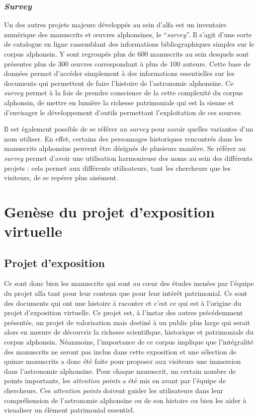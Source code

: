 	\subsubsection{\textit{Survey}}
    Un des autres projets majeurs développés au sein d’\acrshort{alfa} est un inventaire numérique des manuscrits et œuvres alphonsines, le “\textit{survey}”. Il s’agit d’une sorte de catalogue en ligne rassemblant des informations bibliographiques simples sur le corpus alphonsin. Y sont regroupés plus de 600 manuscrits au sein desquels sont présentes plus de 300 œuvres correspondant à plus de 100 auteurs. Cette base de données permet d’accéder simplement à des informations essentielles sur les documents qui permettent de faire l’histoire de l’astronomie alphonsine. Ce \textit{survey} permet à la fois de prendre conscience de la cette complexité du corpus alphonsin, de mettre en lumière la richesse patrimoniale qui est la sienne et d’envisager le développement d’outils permettant l’exploitation de ces sources.
    
    Il est également possible de se référer au \textit{survey} pour savoir quelles variantes d’un nom utiliser. En effet, certains des personnages historiques rencontrés dans les manuscrits alphonsins peuvent être désignés de plusieurs manière. Se référer au \textit{survey} permet d’avoir une utilisation harmonieuse des noms au sein des différents projets : cela permet aux différents utilisateurs, tant les chercheurs que les visiteurs, de se repérer plus aisément. 


	\section{Genèse du projet d’exposition virtuelle}
	
	\subsection{Projet d'exposition}
	Ce sont donc bien les manuscrits qui sont au cœur des études menées par l’équipe du projet \acrshort{alfa} tant pour leur contenu que pour leur intérêt patrimonial. Ce sont des documents qui ont une histoire à raconter et c’est ce qui est à l’origine du projet d’exposition virtuelle. Ce projet est, à l’instar des autres précédemment présentés, un projet de valorisation mais destiné à un public plus large qui serait alors en mesure de découvrir la richesse scientifique, historique et patrimoniale du corpus alphonsin. Néanmoins, l’importance de ce corpus implique que l’intégralité des manuscrits ne seront pas inclus dans cette exposition et une sélection de quinze manuscrits a donc été faite pour proposer aux visiteurs une immersion dans l’astronomie alphonsine. Pour chaque manuscrit, un certain nombre de points importants, les \textit{attention points} a été mis en avant par l’équipe de chercheurs. Ces \textit{attention points} doivent guider les utilisateurs dans leur compréhension de l’astronomie alphonsine ou de son histoire ou bien les aider à visualiser un élément patrimonial essentiel. 
	
